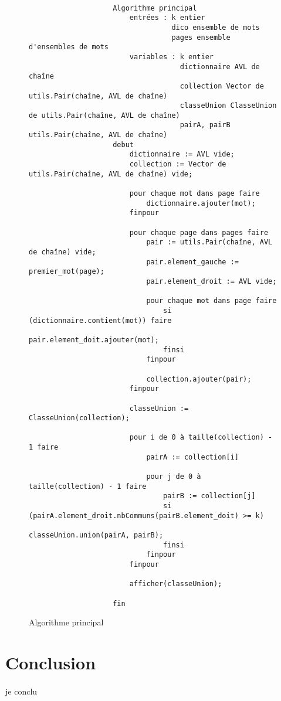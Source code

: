 \documentclass[a4paper]{article}
\begin{document}
			\paragraph{}{
    			\begin{figure}
    	    	    \begin{verbatim}
    	    	    Algorithme principal
    	    	        entrées : k entier
    	    	                  dico ensemble de mots
    	    	                  pages ensemble d'ensembles de mots
    	    	        variables : k entier
    	    	                    dictionnaire AVL de chaîne
    	    	                    collection Vector de utils.Pair(chaîne, AVL de chaîne)
    	    	                    classeUnion ClasseUnion de utils.Pair(chaîne, AVL de chaîne)
    	    	                    pairA, pairB utils.Pair(chaîne, AVL de chaîne)
    	    	    debut
    	    	        dictionnaire := AVL vide;
    	    	        collection := Vector de utils.Pair(chaîne, AVL de chaîne) vide;
    	    	        
    	    	        pour chaque mot dans page faire
    	    	            dictionnaire.ajouter(mot);
    	    	        finpour
    	    	            
    	    	        pour chaque page dans pages faire
    	    	            pair := utils.Pair(chaîne, AVL de chaîne) vide;
    	    	            pair.element_gauche := premier_mot(page);
    	    	            pair.element_droit := AVL vide;
    	    	            
    	    	            pour chaque mot dans page faire
    	    	                si (dictionnaire.contient(mot)) faire
    	    	                    pair.element_doit.ajouter(mot);
    	    	                finsi
    	    	            finpour
    	    	            
    	    	            collection.ajouter(pair);
    	    	        finpour
    	    	        
    	    	        classeUnion := ClasseUnion(collection);
    	    	        
    	    	        pour i de 0 à taille(collection) - 1 faire
    	    	            pairA := collection[i]
    	    	            
    	    	            pour j de 0 à taille(collection) - 1 faire
    	    	                pairB := collection[j]
    	    	                si (pairA.element_droit.nbCommuns(pairB.element_doit) >= k)
    	    	                    classeUnion.union(pairA, pairB);
    	    	                finsi
    	    	            finpour
    	    	        finpour
    	    	        
    	    	        afficher(classeUnion);
    	    	        
    	    	    fin
    	    	    \end{verbatim}
    	    	\caption{Algorithme principal \label{algo_main}}
    	    	\end{figure}
	    	}	
			
	\section*{Conclusion}
		\paragraph{}{je conclu}
		
\end{document}
